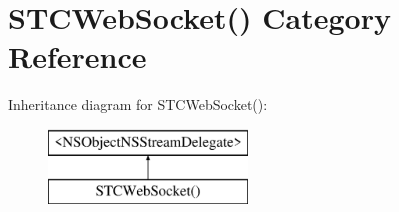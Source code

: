 \hypertarget{category_s_t_c_web_socket_07_08}{}\section{S\+T\+C\+Web\+Socket() Category Reference}
\label{category_s_t_c_web_socket_07_08}
Inheritance diagram for S\+T\+C\+Web\+Socket()\+:\begin{figure}[H]
\begin{center}
\leavevmode
\includegraphics[height=2.000000cm]{category_s_t_c_web_socket_07_08}
\end{center}
\end{figure}
